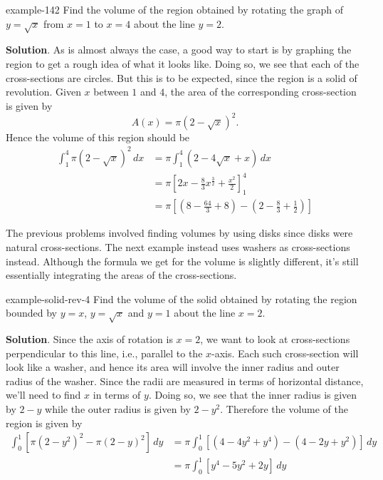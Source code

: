 \documentclass[10pt,]{book}
\numberwithin{equation}{section}
\newcommand{\amp}{&}
\begin{document}
\begin{example}{}{example-142}%
\hypertarget{p-633}{}%
Find the volume of the region obtained by rotating the graph of \(y = \sqrt{x}\) from \(x = 1\) to \(x = 4\) about the line \(y = 2\).%
\par\smallskip%
\noindent\textbf{Solution}.\hypertarget{solution-138}{}\quad%
\hypertarget{p-634}{}%
As is almost always the case, a good way to start is by graphing the region to get a rough idea of what it looks like. Doing so, we see that each of the cross-sections are circles. But this is to be expected, since the region is a solid of revolution. Given \(x\) between \(1\) and \(4\), the area of the corresponding cross-section is given by%
\begin{equation*}
A(x) = \pi(2 - \sqrt{x})^{2}.
\end{equation*}
Hence the volume of this region should be%
\begin{align*}
\int_{1}^{4}\pi(2 - \sqrt{x})^{2}\,dx \amp= \pi\int_{1}^{4}(2 - 4\sqrt{x} + x)\,dx\\
\amp= \pi\left[2x - \frac{8}{3}x^{\frac{3}{2}} + \frac{x^{2}}{2}\right]_{1}^{4}\\
\amp= \pi\left[\left(8 - \frac{64}{3} + 8\right) - \left(2 - \frac{8}{3} + \frac{1}{2}\right)\right]
\end{align*}
%
\end{example}
\hypertarget{p-635}{}%
The previous problems involved finding volumes by using disks since disks were natural cross-sections. The next example instead uses washers as cross-sections instead. Although the formula we get for the volume is slightly different, it's still essentially integrating the areas of the cross-sections.%
\begin{example}{}{example-solid-rev-4}%
\hypertarget{p-636}{}%
Find the volume of the solid obtained by rotating the region bounded by \(y = x\), \(y = \sqrt{x}\) and \(y = 1\) about the line \(x = 2\).%
\par\smallskip%
\noindent\textbf{Solution}.\hypertarget{solution-139}{}\quad%
\hypertarget{p-637}{}%
Since the axis of rotation is \(x = 2\), we want to look at cross-sections perpendicular to this line, i.e., parallel to the \(x\)-axis. Each such cross-section will look like a washer, and hence its area will involve the inner radius and outer radius of the washer. Since the radii are measured in terms of horizontal distance, we'll need to find \(x\) in terms of \(y\). Doing so, we see that the inner radius is given by \(2 - y\) while the outer radius is given by \(2 - y^{2}\). Therefore the volume of the region is given by%
\begin{align*}
\int_{0}^{1}\left[\pi(2 - y^{2})^{2} - \pi(2 - y)^{2}\right]\,dy \amp= \pi\int_{0}^{1}\left[(4 - 4y^{2} + y^{4}) - (4 - 2y + y^{2})\right]\,dy\\
\amp= \pi\int_{0}^{1}\left[y^{4} - 5y^{2} + 2y\right]\,dy
\end{align*}
%
\end{example}
%
%
\typeout{************************************************}
\typeout{************************************************}
%
\end{document}
